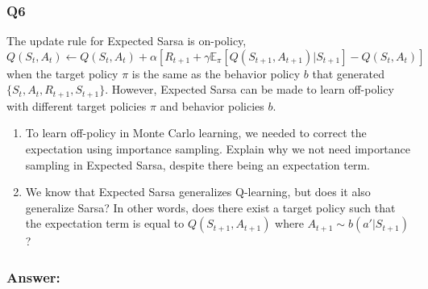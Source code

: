 \documentclass[a4paper, 10pt]{article}
\begin{document}
\subsubsection*{Q6}
The update rule for Expected Sarsa is on-policy,
$$ Q(S_{t}, A_{t}) \leftarrow Q(S_{t}, A_{t}) + \alpha \left[  R_{t+1} + \gamma \mathbb{E}_{\pi}[Q(S_{t+1}, A_{t+1}) | S_{t+1}] - Q(S_{t}, A_{t})\right]$$
when the target policy $\pi$ is the same as the behavior policy $b$ that generated $\{S_{t}, A_{t}, R_{t+1}, S_{t+1}\}$.
However, Expected Sarsa can be made to learn off-policy with different target policies $\pi$ and behavior policies $b$.
\begin{enumerate}
  \item To learn off-policy in Monte Carlo learning, we needed to correct the expectation using importance sampling.
    Explain why we not need importance sampling in Expected Sarsa, despite there being an expectation term.
  \item We know that Expected Sarsa generalizes Q-learning, but does it also generalize Sarsa?
    In other words, does there exist a target policy such that the expectation term is equal to $Q(S_{t+1}, A_{t+1})$ where $A_{t+1} \sim b(a' | S_{t+1})$?
\end{enumerate}
\subsubsection*{Answer:}
\end{document}
